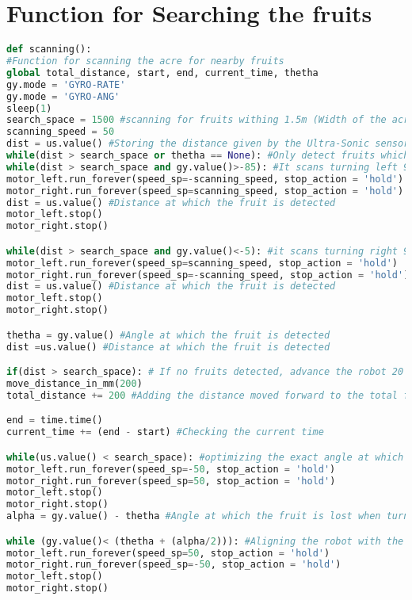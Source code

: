\section{Function for Searching the fruits}
\vspace{-7mm}
\begin{lstlisting}[language={python}, caption={Function for Searching the fruits}, label=scanning]
def scanning():
#Function for scanning the acre for nearby fruits
global total_distance, start, end, current_time, thetha
gy.mode = 'GYRO-RATE'
gy.mode = 'GYRO-ANG'
sleep(1)
search_space = 1500 #scanning for fruits withing 1.5m (Width of the acre)
scanning_speed = 50 
dist = us.value() #Storing the distance given by the Ultra-Sonic sensor
while(dist > search_space or thetha == None): #Only detect fruits which are withing the search space
while(dist > search_space and gy.value()>-85): #It scans turning left 90 degrees
motor_left.run_forever(speed_sp=-scanning_speed, stop_action = 'hold')
motor_right.run_forever(speed_sp=scanning_speed, stop_action = 'hold')
dist = us.value() #Distance at which the fruit is detected
motor_left.stop()
motor_right.stop()

while(dist > search_space and gy.value()<-5): #it scans turning right 90 degrees
motor_left.run_forever(speed_sp=scanning_speed, stop_action = 'hold')
motor_right.run_forever(speed_sp=-scanning_speed, stop_action = 'hold')
dist = us.value() #Distance at which the fruit is detected
motor_left.stop()
motor_right.stop()

thetha = gy.value() #Angle at which the fruit is detected
dist =us.value() #Distance at which the fruit is detected

if(dist > search_space): # If no fruits detected, advance the robot 20 cm
move_distance_in_mm(200)
total_distance += 200 #Adding the distance moved forward to the total for returning to the starting point

end = time.time()
current_time += (end - start) #Checking the current time

while(us.value() < search_space): #optimizing the exact angle at which the fruit is detected, turn the robot until the fruit is lost/no_longer_detected
motor_left.run_forever(speed_sp=-50, stop_action = 'hold')
motor_right.run_forever(speed_sp=50, stop_action = 'hold')    
motor_left.stop()
motor_right.stop()
alpha = gy.value() - thetha #Angle at which the fruit is lost when turning

while (gy.value()< (thetha + (alpha/2))): #Aligning the robot with the center of the fruit
motor_left.run_forever(speed_sp=50, stop_action = 'hold')
motor_right.run_forever(speed_sp=-50, stop_action = 'hold')
motor_left.stop()
motor_right.stop()


\end{lstlisting}
